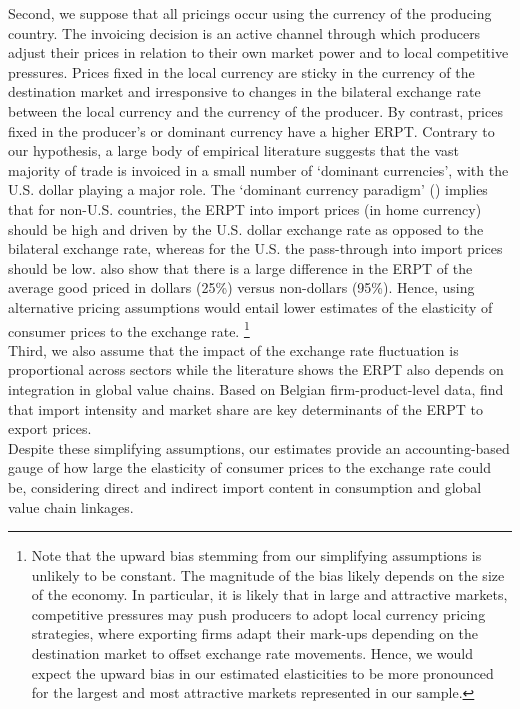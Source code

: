 \documentclass[11pt,a4paper]{paper} %
\begin{document}
Second, we suppose that all pricings occur using the currency of the producing country. The invoicing decision is an active channel through which producers adjust their prices in relation to their own market power and to local competitive pressures. Prices fixed in the local currency are sticky in the currency of the destination market and irresponsive to changes in the bilateral exchange rate between the local currency and the currency of the producer. By contrast, prices fixed in the producer's or dominant currency have a higher ERPT. Contrary to our hypothesis, a large body of empirical literature suggests that the vast majority of trade is invoiced in a small number of ‘dominant currencies’, with the U.S. dollar playing a major role. The ‘dominant currency paradigm’ (\cite{Gopinath2020}) implies that for non-U.S. countries, the ERPT into import prices (in home currency) should be high and driven by the U.S. dollar exchange rate as opposed to the bilateral exchange rate, whereas for the U.S. the pass-through into import prices should be low. \cite{Gopinath2010} also show that there is a large difference in the ERPT of the average good priced in dollars (25\%) versus non-dollars (95\%).
Hence, using alternative pricing assumptions would entail lower estimates of the elasticity of consumer prices to the exchange rate. 
\footnote{Note that the upward bias stemming from our simplifying assumptions is unlikely to be constant. The magnitude of the bias likely depends on the size of the economy. In particular, it is likely that in large and attractive markets, competitive pressures may push producers to adopt local currency pricing strategies, where exporting firms adapt their mark-ups depending on the destination market to offset exchange rate movements. Hence, we would expect the upward bias in our estimated elasticities to be more pronounced for the largest and most attractive markets represented in our sample.} \\
Third, we also assume that the impact of the exchange rate fluctuation is proportional across sectors while the literature shows the ERPT also depends on integration in global value chains. Based on Belgian firm-product-level data, \cite{Amiti2014} find that import intensity and market share are key determinants of the ERPT to export prices.\\
Despite these simplifying assumptions, our estimates provide an accounting-based gauge of how large the elasticity of consumer prices to the exchange rate could be, considering direct and indirect import content in consumption and global value chain linkages. 
\end{document}
